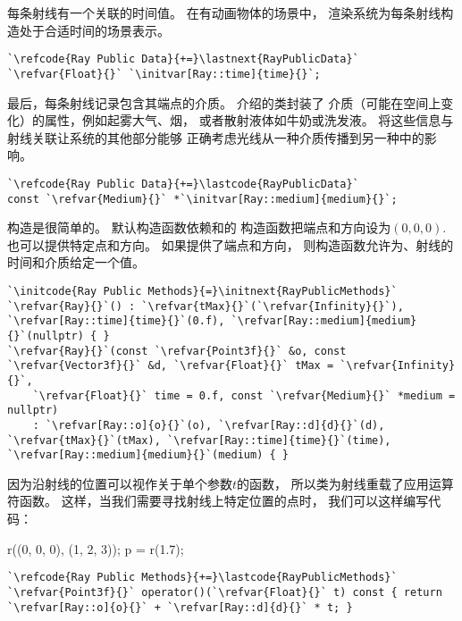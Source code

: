 每条射线有一个关联的时间值。
在有动画物体的场景中，
渲染系统为每条射线构造处于合适时间的场景表示。
\begin{lstlisting}
`\refcode{Ray Public Data}{+=}\lastnext{RayPublicData}`
`\refvar{Float}{}` `\initvar[Ray::time]{time}{}`;
\end{lstlisting}

最后，每条射线记录包含其端点的介质。
介绍的类封装了
介质（可能在空间上变化）的属性，例如起雾大气、烟，
或者散射液体如牛奶或洗发液。
将这些信息与射线关联让系统的其他部分能够
正确考虑光线从一种介质传播到另一种中的影响。
\begin{lstlisting}
`\refcode{Ray Public Data}{+=}\lastcode{RayPublicData}`
const `\refvar{Medium}{}` *`\initvar[Ray::medium]{medium}{}`;
\end{lstlisting}

构造是很简单的。
默认构造函数依赖和的
构造函数把端点和方向设为$(0,0,0)$.
也可以提供特定点和方向。
如果提供了端点和方向，
则构造函数允许为、射线的时间和介质给定一个值。
\begin{lstlisting}
`\initcode{Ray Public Methods}{=}\initnext{RayPublicMethods}`
`\refvar{Ray}{}`() : `\refvar{tMax}{}`(`\refvar{Infinity}{}`), `\refvar[Ray::time]{time}{}`(0.f), `\refvar[Ray::medium]{medium}{}`(nullptr) { }
`\refvar{Ray}{}`(const `\refvar{Point3f}{}` &o, const `\refvar{Vector3f}{}` &d, `\refvar{Float}{}` tMax = `\refvar{Infinity}{}`,
    `\refvar{Float}{}` time = 0.f, const `\refvar{Medium}{}` *medium = nullptr)
    : `\refvar[Ray::o]{o}{}`(o), `\refvar[Ray::d]{d}{}`(d), `\refvar{tMax}{}`(tMax), `\refvar[Ray::time]{time}{}`(time), `\refvar[Ray::medium]{medium}{}`(medium) { }
\end{lstlisting}

因为沿射线的位置可以视作关于单个参数$t$的函数，
所以类为射线重载了应用运算符函数。
这样，当我们需要寻找射线上特定位置的点时，
我们可以这样编写代码：

{\ttfamily\indent\indent{} r((0, 0, 0), (1, 2, 3));}\newline
{\ttfamily\indent\indent{} p = r(1.7);}

\begin{lstlisting}
`\refcode{Ray Public Methods}{+=}\lastcode{RayPublicMethods}`
`\refvar{Point3f}{}` operator()(`\refvar{Float}{}` t) const { return `\refvar[Ray::o]{o}{}` + `\refvar[Ray::d]{d}{}` * t; }
\end{lstlisting}

